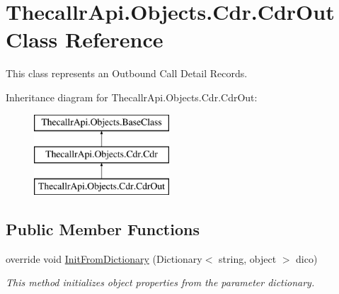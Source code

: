\hypertarget{class_thecallr_api_1_1_objects_1_1_cdr_1_1_cdr_out}{\section{Thecallr\+Api.\+Objects.\+Cdr.\+Cdr\+Out Class Reference}
\label{class_thecallr_api_1_1_objects_1_1_cdr_1_1_cdr_out}
}


This class represents an Outbound Call Detail Records.  


Inheritance diagram for Thecallr\+Api.\+Objects.\+Cdr.\+Cdr\+Out\+:\begin{figure}[H]
\begin{center}
\leavevmode
\includegraphics[height=3.000000cm]{class_thecallr_api_1_1_objects_1_1_cdr_1_1_cdr_out}
\end{center}
\end{figure}
\subsection*{Public Member Functions}
\begin{DoxyCompactItemize}
\item 
override void \hyperlink{class_thecallr_api_1_1_objects_1_1_cdr_1_1_cdr_out_aea66d434d7e9762633a0c59fd4837d2b}{Init\+From\+Dictionary} (Dictionary$<$ string, object $>$ dico)
\begin{DoxyCompactList}\small\item\em This method initializes object properties from the parameter dictionary. \end{DoxyCompactList}\end{DoxyCompactItemize}
